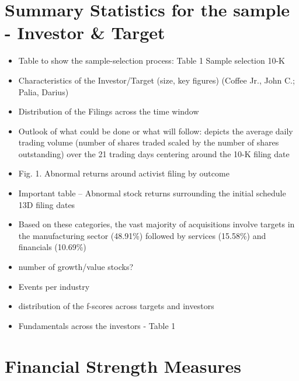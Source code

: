 \documentclass[12pt]{article}
\begin{document}
\section{Summary Statistics for the sample - Investor \& Target}

    \begin{itemize}

        \item Table to show the sample-selection process: Table 1 Sample selection 10-K \citep{You2009}

        \item Characteristics of the Investor/Target (size, key figures) (Coffee Jr., John C.; Palia, Darius)

        \item Distribution of the Filings across the time window

        \item Outlook of what could be done or what will follow: depicts the average daily trading volume (number of shares traded scaled by the number of shares outstanding) over the 21 trading days centering around the 10-K filing date \citep{You2009}

        \item Fig. 1. Abnormal returns around activist filing by outcome \citep[p. 370]{Greenwood2009}

        \item Important table -- Abnormal stock returns surrounding the initial schedule 13D filing dates \citep{Klein2009}

        \item Based on these categories, the vast majority of acquisitions involve targets in the manufacturing sector (48.91\%) followed by services (15.58\%) and financials (10.69\%) \citep{Akhigbe2007}

        \item number of growth/value stocks? 

        \item Events per industry

        \item distribution of the f-scores across targets and investors

        \item Fundamentals across the investors - Table 1 \citep{DUCHIN2010}

    \end{itemize}
\section{Financial Strength Measures}
\end{document}

